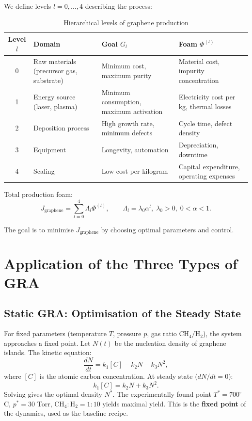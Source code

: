 \documentclass[12pt,a4paper]{article}
\begin{document}
We define levels \(l = 0,\dots,4\) describing the process:

\begin{table}[h]
\centering
\caption{Hierarchical levels of graphene production}
\label{tab:levels}
\begin{tabular}{|c|l|l|p{5cm}|}
\hline
Level \(l\) & Domain & Goal \(G_l\) & Foam \(\Phi^{(l)}\) \\
\hline
0 & Raw materials (precursor gas, substrate) & Minimum cost, maximum purity & Material cost, impurity concentration \\
1 & Energy source (laser, plasma) & Minimum consumption, maximum activation & Electricity cost per kg, thermal losses \\
2 & Deposition process & High growth rate, minimum defects & Cycle time, defect density \\
3 & Equipment & Longevity, automation & Depreciation, downtime \\
4 & Scaling & Low cost per kilogram & Capital expenditure, operating expenses \\
\hline
\end{tabular}
\end{table}

Total production foam:
\[
J_{\text{graphene}} = \sum_{l=0}^{4} \Lambda_l \Phi^{(l)},\qquad \Lambda_l = \lambda_0 \alpha^l,\; \lambda_0>0,\;0<\alpha<1.
\]

The goal is to minimise \(J_{\text{graphene}}\) by choosing optimal parameters and control.

\section{Application of the Three Types of GRA}

\subsection{Static GRA: Optimisation of the Steady State}

For fixed parameters (temperature \(T\), pressure \(p\), gas ratio \(\text{CH}_4/\text{H}_2\)), the system approaches a fixed point. Let \(N(t)\) be the nucleation density of graphene islands. The kinetic equation:
\[
\frac{dN}{dt} = k_1 [C] - k_2 N - k_3 N^2,
\]
where \([C]\) is the atomic carbon concentration. At steady state (\(dN/dt=0\)):
\[
k_1 [C] = k_2 N + k_3 N^2.
\]
Solving gives the optimal density \(N^*\). The experimentally found point \(T^* = 700^\circ\)C, \(p^* = 30\) Torr, \(\text{CH}_4:\text{H}_2 = 1:10\) yields maximal yield. This is the \textbf{fixed point} of the dynamics, used as the baseline recipe.
\end{document}
